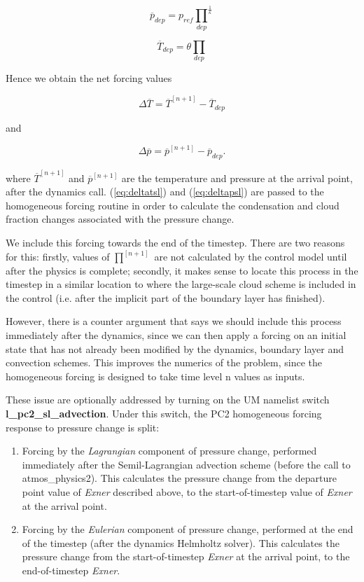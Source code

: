 \documentclass{UMDP_article}
\begin{document}
\[
\overline{p}_{dep} = p_{ref} {\prod_{dep}}^{\frac{1}{\kappa}}
\]

\[
\overline{T}_{dep} = \theta \prod_{dep}
\]

Hence we obtain the net forcing values 

\begin{equation}
\Delta \overline{T} = \overline{T}^{[n+1]} - \overline{T}_{dep}
\label{eq:deltatsl}
\end{equation}

and

\begin{equation}
\Delta \overline{p} = \overline{p}^{[n+1]} - \overline{p}_{dep} .
\label{eq:deltapsl}
\end{equation}

where $\overline{T}^{[n+1]}$ and $\overline{p}^{[n+1]}$ are the temperature
and pressure at the arrival point, after the dynamics call.
(\ref{eq:deltatsl}) and (\ref{eq:deltapsl}) are passed to the homogeneous
forcing routine in order to calculate
the condensation and cloud fraction changes associated with the pressure
change.

We include this forcing towards the end of the timestep. There are two
reasons for this:
firstly, values of $\prod^{[n+1]}$ are not calculated by the control model
until after the physics is complete; secondly, it makes sense to locate this
process in the timestep in a similar location
to where the large-scale cloud scheme is included in the control (i.e.
after the implicit part of the boundary layer has finished).

However, there
is a counter argument that says we should include this process immediately
after the dynamics, since we can then apply a forcing on an initial state
that has not already been modified by the dynamics, boundary layer and
convection schemes. This improves the numerics of the problem, since the
homogeneous forcing is designed to take time level n values as inputs.

These issue are optionally addressed by turning on the UM namelist switch
\textbf{l\_pc2\_sl\_advection}.  Under this switch, the PC2 homogeneous
forcing response to pressure change is split:
\begin{enumerate}
\item Forcing by the \textit{Lagrangian} component of pressure change,
performed immediately after the Semil-Lagrangian advection scheme
(before the call to atmos\_physics2).
This calculates the pressure change from the departure point value of
\textit{Exner} described above, to the start-of-timestep value of
\textit{Exner} at the arrival point.
\item Forcing by the \textit{Eulerian} component of pressure change,
performed at the end of the timestep (after the dynamics Helmholtz solver).
This calculates the pressure change from the start-of-timestep \textit{Exner}
at the arrival point, to the end-of-timestep \textit{Exner}.
\end{enumerate}
\end{document}
